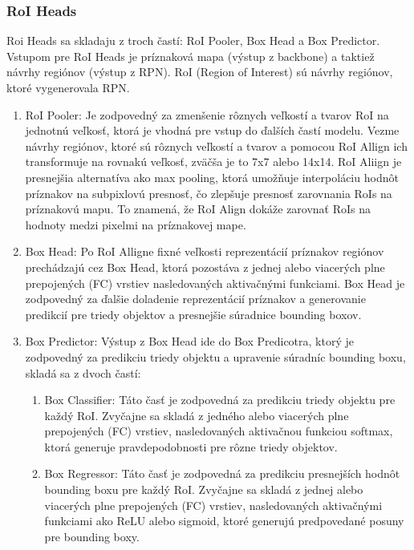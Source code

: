 \subsubsection{RoI Heads}

Roi Heads sa skladaju z troch častí: RoI Pooler, Box Head a Box Predictor. Vstupom pre RoI Heads je príznaková mapa (výstup z backbone) a taktiež návrhy regiónov (výstup z RPN). RoI (Region of Interest) sú návrhy regiónov, ktoré vygenerovala RPN.
\begin{enumerate}
  \item RoI Pooler: Je zodpovedný za zmenšenie rôznych veľkostí a tvarov RoI na jednotnú veľkosť, ktorá je vhodná pre vstup do ďalších častí modelu. Vezme návrhy regiónov, ktoré sú rôznych veľkostí a tvarov a pomocou RoI Allign ich transformuje na rovnakú veľkosť, zväčša je to 7x7 alebo 14x14. RoI Aliign je presnejšia alternatíva ako max pooling, ktorá umožňuje interpoláciu hodnôt príznakov na subpixlovú presnosť, čo zlepšuje presnosť zarovnania RoIs na príznakovú mapu. To znamená, že RoI Align dokáže zarovnať RoIs na hodnoty medzi pixelmi na príznakovej mape.
  \item Box Head: Po RoI Alligne fixné veľkosti reprezentácií príznakov regiónov prechádzajú cez Box Head, ktorá pozostáva z jednej alebo viacerých plne prepojených (FC) vrstiev nasledovaných aktivačnými funkciami. Box Head je zodpovedný za ďalšie doladenie reprezentácií príznakov a generovanie predikcií pre triedy objektov a presnejšie súradnice bounding boxov.
  \item Box Predictor: Výstup z Box Head ide do Box Predicotra, ktorý je zodpovedný za predikciu triedy objektu a upravenie súradníc bounding boxu, skladá sa z dvoch častí: 
  \begin{enumerate}
  \item Box Classifier: Táto časť je zodpovedná za predikciu triedy objektu pre každý RoI. Zvyčajne sa skladá z jedného alebo viacerých plne prepojených (FC) vrstiev, nasledovaných aktivačnou funkciou softmax, ktorá generuje pravdepodobnosti pre rôzne triedy objektov.
  \item Box Regressor: Táto časť je zodpovedná za predikciu presnejších hodnôt bounding boxu pre každý RoI. Zvyčajne sa skladá z jednej alebo viacerých plne prepojených (FC) vrstiev, nasledovaných aktivačnými funkciami ako ReLU alebo sigmoid, ktoré generujú predpovedané posuny pre bounding boxy.
  \end{enumerate}
\end{enumerate}
 
